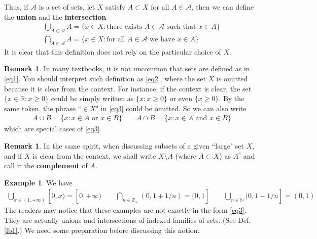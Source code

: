 \documentclass[12pt,b5paper,notitlepage]{article}
\theoremstyle{definition}
\newtheorem{eg}[df]{Example}
\newtheorem{rem}[df]{Remark}
\theoremstyle{plain}
\newcommand{\scr}{\mathscr}
\newcommand{\Nbb}{\mathbb N}
\newcommand{\Zbb}{\mathbb Z}
\newcommand{\Rbb}{\mathbb R}
\numberwithin{equation}{section}
\begin{document}
Thus, if $\scr A$ is a set of sets, let $X$ satisfy $A\subset X$ for all $A\in\scr A$, then we can define the \textbf{union} and the \textbf{intersection} 
\begin{subequations}\label{eq3}
\begin{gather}
\bigcup_{A\in\scr A}A=\{x\in X:\text{there exists $A\in\scr A$ such that $x\in A$}\}\\
\bigcap_{A\in\scr A}A=\{x\in X:\text{for all $A\in\scr A$ we have $x\in A$}\}
\end{gather}
\end{subequations}
It is clear that this definition does not rely on the particular choice of $X$.

\begin{rem}
In many textbooks, it is not uncommon that sets are defined as in \eqref{eq1}. You should interpret such definition as \eqref{eq2}, where the set $X$ is omitted because it is clear from the context. For instance, if the context is clear, the set $\{x\in\Rbb:x\geq 0\}$ could be simply written as $\{x:x\geq0\}$ or even $\{x\geq0\}$. By the same token, the phrase ``$\in X$" in \eqref{eq3} could be omitted. So we can also write
\begin{gather*}
A\cup B=\{x: x\in A\text{ or }x\in B\} \qquad  A\cap B=\{x: x\in A\text{ and }x\in B\}
\end{gather*}
which are special cases of \eqref{eq3}.
\end{rem}


\begin{rem}
In the same spirit, when discussing subsets of a given ``large" set $X$, and if $X$ is clear from the context, we shall write $X\setminus A$ (where $A\subset X$) as $A^c$  and call it the \textbf{complement} of $A$.
\end{rem}


\begin{eg}
We have
\begin{gather*}
\bigcup_{x\in(1,+\infty)}[0,x)=[0,+\infty)\qquad\bigcap_{n\in\Zbb_+}(0,1+1/n)=(0,1]\qquad \bigcup_{n\in\Nbb}(0,1-1/n]=(0,1)
\end{gather*}
The readers may notice that these examples are not exactly in the form \eqref{eq3}. They are actually unions and intersections of indexed families of sets. (See Def. \ref{lb1}.) We need some preparation before discussing this notion.
\end{eg}
\end{document}
